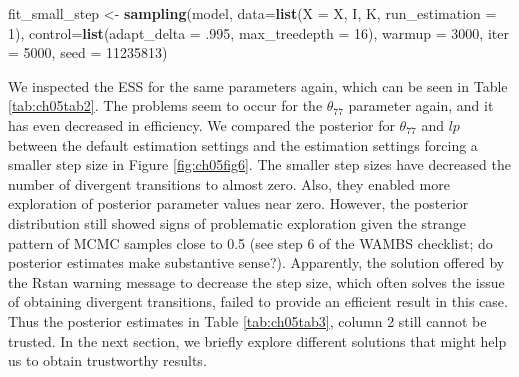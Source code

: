\documentclass[openright,titlepage,12pt,a4paper]{book}
\newenvironment{Shaded}{\begin{snugshade}}{\end{snugshade}}
\newcommand{\DataTypeTok}[1]{\textcolor[rgb]{0.13,0.29,0.53}{#1}}
\newcommand{\DecValTok}[1]{\textcolor[rgb]{0.00,0.00,0.81}{#1}}
\newcommand{\FloatTok}[1]{\textcolor[rgb]{0.00,0.00,0.81}{#1}}
\newcommand{\KeywordTok}[1]{\textcolor[rgb]{0.13,0.29,0.53}{\textbf{#1}}}
\newcommand{\NormalTok}[1]{#1}
\newcommand{\StringTok}[1]{\textcolor[rgb]{0.31,0.60,0.02}{#1}}
\begin{document}
\begin{Shaded}
\begin{Highlighting}[]
\NormalTok{fit_small_step <-}\StringTok{ }\KeywordTok{sampling}\NormalTok{(model, }
                           \DataTypeTok{data=}\KeywordTok{list}\NormalTok{(}\DataTypeTok{X =}\NormalTok{ X, I, K, }\DataTypeTok{run_estimation =} \DecValTok{1}\NormalTok{),}
                           \DataTypeTok{control=}\KeywordTok{list}\NormalTok{(}\DataTypeTok{adapt_delta =} \FloatTok{.995}\NormalTok{,}
                                        \DataTypeTok{max_treedepth =} \DecValTok{16}\NormalTok{),}
                           \DataTypeTok{warmup =} \DecValTok{3000}\NormalTok{, }\DataTypeTok{iter =} \DecValTok{5000}\NormalTok{, }\DataTypeTok{seed =} \DecValTok{11235813}\NormalTok{) }
\end{Highlighting}
\end{Shaded}

We inspected the ESS for the same parameters again, which can be seen in Table \ref{tab:ch05tab2}. The problems seem to occur for the \(\theta_{77}\) parameter again, and it has even decreased in efficiency. We compared the posterior for \(\theta_{77}\) and \(lp\) between the default estimation settings and the estimation settings forcing a smaller step size in Figure \ref{fig:ch05fig6}. The smaller step sizes have decreased the number of divergent transitions to almost zero. Also, they enabled more exploration of posterior parameter values near zero. However, the posterior distribution still showed signs of problematic exploration given the strange pattern of MCMC samples close to 0.5 (see step 6 of the WAMBS checklist; do posterior estimates make substantive sense?). Apparently, the solution offered by the Rstan warning message to decrease the step size, which often solves the issue of obtaining divergent transitions, failed to provide an efficient result in this case. Thus the posterior estimates in Table \ref{tab:ch05tab3}, column 2 still cannot be trusted. In the next section, we briefly explore different solutions that might help us to obtain trustworthy results.
\end{document}
